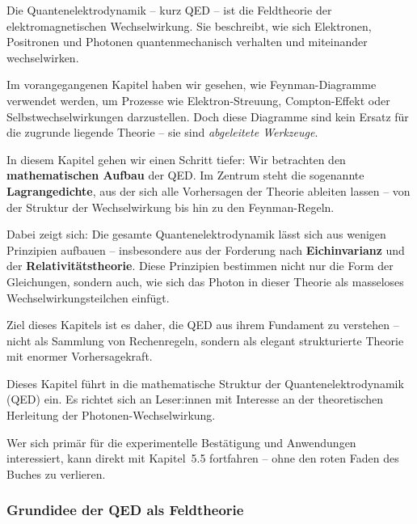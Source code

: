 Die Quantenelektrodynamik – kurz QED – ist die Feldtheorie der elektromagnetischen Wechselwirkung. Sie beschreibt, wie sich Elektronen, Positronen und Photonen quantenmechanisch verhalten und miteinander wechselwirken.

Im vorangegangenen Kapitel haben wir gesehen, wie Feynman-Dia\-gramme verwendet werden, um Prozesse wie Elektron-Streuung, Compton-Effekt oder Selbstwechselwirkungen darzustellen. Doch diese Diagramme sind kein Ersatz für die zugrunde liegende Theorie – sie sind \emph{abgeleitete Werkzeuge}.

In diesem Kapitel gehen wir einen Schritt tiefer: Wir betrachten den \textbf{mathematischen Aufbau} der QED. Im Zentrum steht die sogenannte \textbf{Lagrangedichte}, aus der sich alle Vorhersagen der Theorie ableiten lassen – von der Struktur der Wechselwirkung bis hin zu den Feynman-Regeln.

Dabei zeigt sich: Die gesamte Quantenelektrodynamik lässt sich aus wenigen Prinzipien aufbauen – insbesondere aus der Forderung nach \textbf{Eichinvarianz} und der \textbf{Relativitätstheorie}. Diese Prinzipien bestimmen nicht nur die Form der Gleichungen, sondern auch, wie sich das Photon in dieser Theorie als masseloses Wechselwirkungsteilchen einfügt.

Ziel dieses Kapitels ist es daher, die QED aus ihrem Fundament zu verstehen – nicht als Sammlung von Rechenregeln, sondern als elegant strukturierte Theorie mit enormer Vorhersagekraft.
\vspace{1em}
\begin{tcolorbox}[hinweisbox, title=Hinweis für Leser:innen]
	\label{box:Hinweis füe Leser}
	Dieses Kapitel führt in die mathematische Struktur der Quantenelektrodynamik (QED) ein. Es richtet sich an Leser:innen mit Interesse an der theoretischen Herleitung der Photonen-Wechselwirkung. 
	
	Wer sich primär für die experimentelle Bestätigung und Anwendungen interessiert, kann direkt mit Kapitel~5.5 fortfahren – ohne den roten Faden des Buches zu verlieren.
\end{tcolorbox}
\newpage
\noindent
\subsubsection{Grundidee der QED als Feldtheorie}

